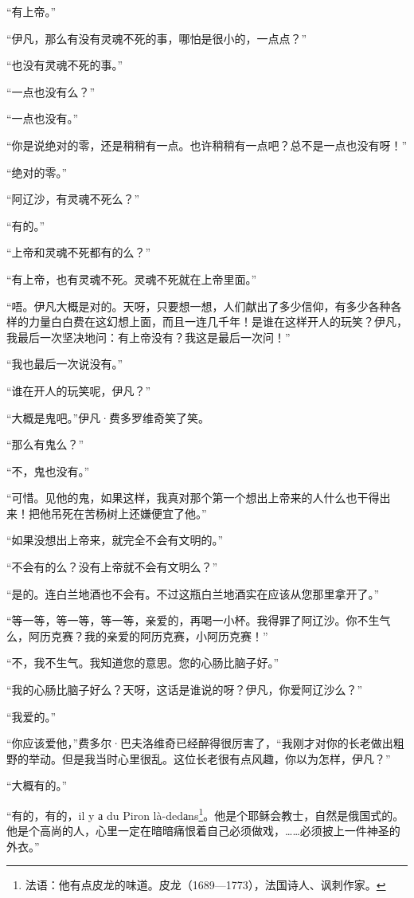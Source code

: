 \par “有上帝。”
\par “伊凡，那么有没有灵魂不死的事，哪怕是很小的，一点点？”
\par “也没有灵魂不死的事。”
\par “一点也没有么？”
\par “一点也没有。”
\par “你是说绝对的零，还是稍稍有一点。也许稍稍有一点吧？总不是一点也没有呀！”
\par “绝对的零。”
\par “阿辽沙，有灵魂不死么？”
\par “有的。”
\par “上帝和灵魂不死都有的么？”
\par “有上帝，也有灵魂不死。灵魂不死就在上帝里面。”
\par “唔。伊凡大概是对的。天呀，只要想一想，人们献出了多少信仰，有多少各种各样的力量白白费在这幻想上面，而且一连几千年！是谁在这样开人的玩笑？伊凡，我最后一次坚决地问：有上帝没有？我这是最后一次问！”
\par “我也最后一次说没有。”
\par “谁在开人的玩笑呢，伊凡？”
\par “大概是鬼吧。”伊凡·费多罗维奇笑了笑。
\par “那么有鬼么？”
\par “不，鬼也没有。”
\par “可惜。见他的鬼，如果这样，我真对那个第一个想出上帝来的人什么也干得出来！把他吊死在苦杨树上还嫌便宜了他。”
\par “如果没想出上帝来，就完全不会有文明的。”
\par “不会有的么？没有上帝就不会有文明么？”
\par “是的。连白兰地酒也不会有。不过这瓶白兰地酒实在应该从您那里拿开了。”
\par “等一等，等一等，等一等，亲爱的，再喝一小杯。我得罪了阿辽沙。你不生气么，阿历克赛？我的亲爱的阿历克赛，小阿历克赛！”
\par “不，我不生气。我知道您的意思。您的心肠比脑子好。”
\par “我的心肠比脑子好么？天呀，这话是谁说的呀？伊凡，你爱阿辽沙么？”
\par “我爱的。”
\par “你应该爱他，”费多尔·巴夫洛维奇已经醉得很厉害了，“我刚才对你的长老做出粗野的举动。但是我当时心里很乱。这位长老很有点风趣，你以为怎样，伊凡？”
\par “大概有的。”
\par “有的，有的，il y а du Piron là-dedаns\footnote{法语：他有点皮龙的味道。皮龙（1689—1773），法国诗人、讽刺作家。}。他是个耶稣会教士，自然是俄国式的。他是个高尚的人，心里一定在暗暗痛恨着自己必须做戏，……必须披上一件神圣的外衣。”
